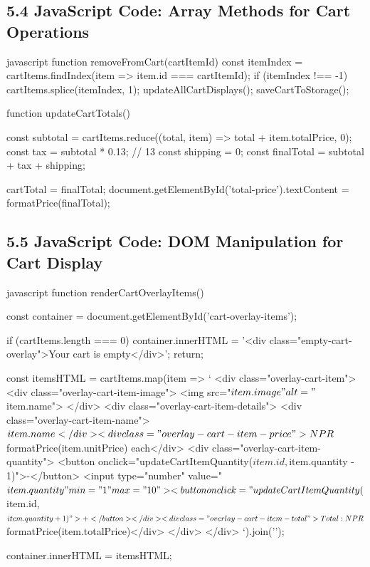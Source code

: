 \documentclass[a4paper,12pt]{article}
\begin{document}
\subsection*{5.4 JavaScript Code: Array Methods for Cart Operations}
\begin{code}[fontsize=\small]{javascript}
  function removeFromCart(cartItemId) {
      const itemIndex = cartItems.findIndex(item => item.id === cartItemId);
      if (itemIndex !== -1) {
          cartItems.splice(itemIndex, 1);
          updateAllCartDisplays();
          saveCartToStorage();
        }
    }

  function updateCartTotals() {
      const subtotal = cartItems.reduce((total, item) => total + item.totalPrice, 0);
      const tax = subtotal * 0.13; // 13%
      const shipping = 0;
      const finalTotal = subtotal + tax + shipping;

      cartTotal = finalTotal;
      document.getElementById('total-price').textContent = formatPrice(finalTotal);
    }
\end{code}

\subsection*{5.5 JavaScript Code: DOM Manipulation for Cart Display}
\begin{code}[fontsize=\small]{javascript}
  function renderCartOverlayItems() {
      const container = document.getElementById('cart-overlay-items');

      if (cartItems.length === 0) {
          container.innerHTML = '<div class="empty-cart-overlay">Your cart is empty</div>';
          return;
        }

      const itemsHTML = cartItems.map(item => `
      <div class="overlay-cart-item">
        <div class="overlay-cart-item-image">
          <img src="${item.image}" alt="${item.name}">
        </div>
        <div class="overlay-cart-item-details">
          <div class="overlay-cart-item-name">${item.name}</div>
          <div class="overlay-cart-item-price">NPR ${formatPrice(item.unitPrice)} each</div>
          <div class="overlay-cart-item-quantity">
            <button onclick="updateCartItemQuantity(${item.id}, ${item.quantity - 1})">-</button>
            <input type="number" value="${item.quantity}" min="1" max="10">
            <button onclick="updateCartItemQuantity(${item.id}, ${item.quantity + 1})">+</button>
          </div>
          <div class="overlay-cart-item-total">Total: NPR ${formatPrice(item.totalPrice)}</div>
        </div>
      </div>
      `).join('');

      container.innerHTML = itemsHTML;
    }
\end{code}
\end{document}
